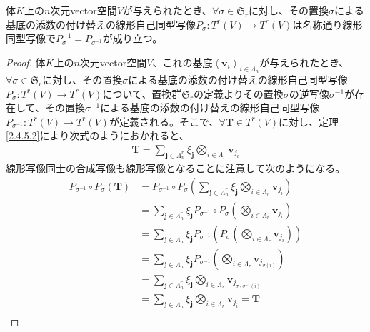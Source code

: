 \documentclass[dvipdfmx]{jsarticle}
\begin{document}
\begin{thm}\label{2.4.8.5}
体$K$上の$n$次元vector空間$V$が与えられたとき、$\forall\sigma \in \mathfrak{S}_{r}$に対し、その置換$\sigma$による基底の添数の付け替えの線形自己同型写像$P_{\sigma}:T^{r}(V) \rightarrow T^{r}(V)$は名称通り線形同型写像で$P_{\sigma}^{- 1} = P_{\sigma^{- 1}}$が成り立つ。
\end{thm}
\begin{proof}
体$K$上の$n$次元vector空間$V$、これの基底$\left\langle \mathbf{v}_{i} \right\rangle_{i \in \varLambda_{n}}$が与えられたとき、$\forall\sigma \in \mathfrak{S}_{r}$に対し、その置換$\sigma$による基底の添数の付け替えの線形自己同型写像$P_{\sigma}:T^{r}(V) \rightarrow T^{r}(V)$について、置換群$\mathfrak{S}_{r}$の定義よりその置換$\sigma$の逆写像$\sigma^{- 1}$が存在して、その置換$\sigma^{- 1}$による基底の添数の付け替えの線形自己同型写像$P_{\sigma^{- 1}}:T^{r}(V) \rightarrow T^{r}(V)$が定義される。そこで、$\forall\mathbf{T} \in T^{r}(V)$に対し、定理\ref{2.4.5.2}により次式のようにおかれると、
\begin{align*}
\mathbf{T} = \sum_{\mathbf{j} \in \varLambda_{n}^{r}} {\xi_{\mathbf{j}}\bigotimes_{i \in \varLambda_{r}} \mathbf{v}_{j_{i}}}
\end{align*}
線形写像同士の合成写像も線形写像となることに注意して次のようになる。
\begin{align*}
P_{\sigma^{- 1}} \circ P_{\sigma}\left( \mathbf{T} \right) &= P_{\sigma^{- 1}} \circ P_{\sigma}\left( \sum_{\mathbf{j} \in \varLambda_{n}^{r}} {\xi_{\mathbf{j}}\bigotimes_{i \in \varLambda_{r}} \mathbf{v}_{j_{i}}} \right)\\
&= \sum_{\mathbf{j} \in \varLambda_{n}^{r}} {\xi_{\mathbf{j}}P_{\sigma^{- 1}} \circ P_{\sigma}\left( \bigotimes_{i \in \varLambda_{r}} \mathbf{v}_{j_{i}} \right)}\\
&= \sum_{\mathbf{j} \in \varLambda_{n}^{r}} {\xi_{\mathbf{j}}P_{\sigma^{- 1}}\left( P_{\sigma}\left( \bigotimes_{i \in \varLambda_{r}} \mathbf{v}_{j_{i}} \right) \right)}\\
&= \sum_{\mathbf{j} \in \varLambda_{n}^{r}} {\xi_{\mathbf{j}}P_{\sigma^{- 1}}\left( \bigotimes_{i \in \varLambda_{r}} \mathbf{v}_{j_{\sigma(i)}} \right)}\\
&= \sum_{\mathbf{j} \in \varLambda_{n}^{r}} {\xi_{\mathbf{j}}\bigotimes_{i \in \varLambda_{r}} \mathbf{v}_{j_{\sigma \circ \sigma^{- 1}(i)}}}\\
&= \sum_{\mathbf{j} \in \varLambda_{n}^{r}} {\xi_{\mathbf{j}}\bigotimes_{i \in \varLambda_{r}} \mathbf{v}_{j_{i}}} = \mathbf{T}\\

\end{align*}
\end{proof}
\end{document}

